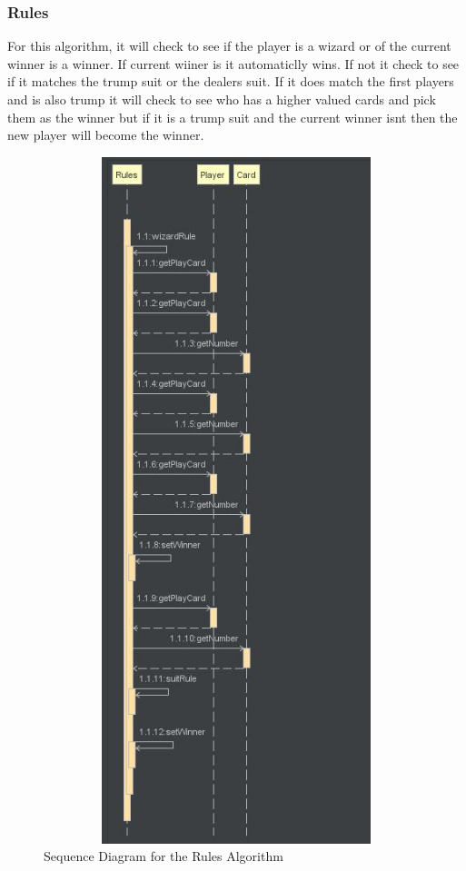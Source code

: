 \subsubsection{Rules}
For this algorithm, it will check to see if the player is a wizard or of the current winner is a winner. If current wiiner is it automaticlly wins. If not it check to see if it matches the trump suit or the dealers suit. If it does match the first players and is also trump it will check to see who has a higher valued cards and pick them as the winner but if it is a trump suit and the current winner isnt then the new player will become the winner.
\begin{figure}
\centering
\includegraphics[width=15cm ,height=20cm,keepaspectratio]{RuleSequenceDiagram}
\caption{Sequence Diagram for the Rules Algorithm}
\label{fig:Rules}
\end{figure}
